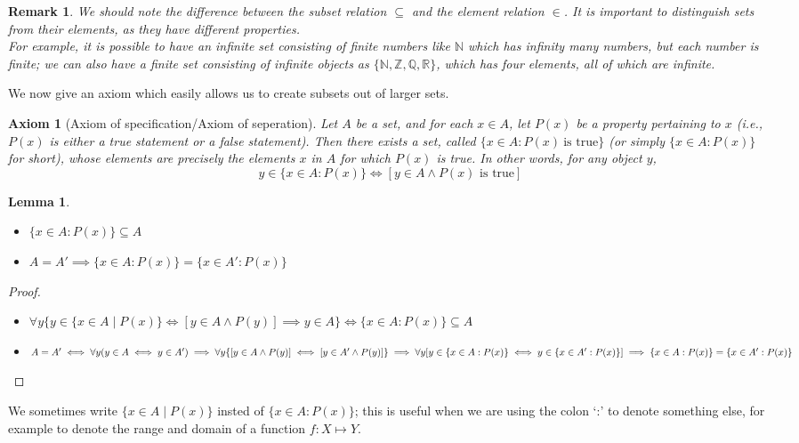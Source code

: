 \documentclass[a4paper]{book}
\newtheorem*{proof}{\textit{Proof.}}
\newtheorem{axiom}{Axiom}[chapter]
\newtheorem{lemma}{Lemma}[section]
\newtheorem{remark}{Remark}[section]
\begin{document}
			\begin{remark}
				We should note the difference between the subset relation $\subseteq$ and the element relation $\in$. It is important to distinguish sets from their elements, as they have different properties.\\
				For example, it is possible to have an infinite set consisting of finite numbers like $\mathbb{N}$ which has infinity many numbers, but each number is finite; we can also have a finite set consisting of infinite objects as $\{\mathbb{N},\mathbb{Z},\mathbb{Q},\mathbb{R}\}$, which has four elements, all of which are infinite.
			\end{remark}
			We now give an axiom which easily allows us to create subsets out of larger sets.
			\begin{axiom}[Axiom of specification/Axiom of seperation]
				Let $A$ be a set, and for each $x\in A$, let $P(x)$ be a property pertaining to $x$ (\textit{i.e.,} $P(x)$ is either a true statement or a false statement). Then there exists a set, called $\{x\in A:P(x)~\textrm{is~true}\}$ (or simply $\{x\in A:P(x)\}$ for short), whose elements are precisely the elements $x$ in $A$ for which $P(x)$ is true. In other words, for any object $y$, $$y\in\{x\in A:P(x)\}\iff[y\in A\land P(x)\textrm{~is~true}]$$
			\end{axiom}
			\begin{lemma}~
				\begin{itemize}
					\item $\{x\in A:P(x)\}\subseteq A$
					\item $A=A'\implies\{x\in A:P(x)\}=\{x\in A':P(x)\}$
				\end{itemize}
			\end{lemma}
			\begin{proof}~
				\begin{itemize}
					\item $\forall y\{y\in\{x\in A\mid P(x)\}\iff[y\in A\land P(y)]\implies y\in A\}\iff \{x\in A:P(x)\}\subseteq A$
					\item $A=A'\iff\forall y(y\in A\iff y\in A')\implies\forall y\{[y\in A\land P(y)]\iff[y\in A'\land P(y)]\}\\\implies\forall y[y\in\{x\in A:P(x)\}\iff y\in\{x\in A':P(x)\}]\\\implies\{x\in A:P(x)\}=\{x\in A':P(x)\}$
				\end{itemize}
			\end{proof}
			We sometimes write $\{x\in A\mid P(x)\}$ insted of $\{x\in A:P(x)\}$; this is useful when we are using the colon `:' to denote something else, for example to denote the range and domain of a function $f: X\mapsto Y$.\\
\end{document}
